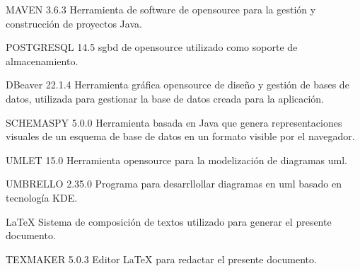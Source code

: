  MAVEN 3.6.3\newline
 Herramienta de software de \gls{opensource} para la gestión y construcción de proyectos Java.
 \newline

 
 POSTGRESQL 14.5\newline
 \acrshort{sgbd} de \gls{opensource} utilizado como soporte de almacenamiento.
\newline
 
 DBeaver 22.1.4\newline
 Herramienta gráfica \gls{opensource} de diseño y gestión de bases de datos, utilizada para gestionar la base de datos creada para la aplicación.
 \newline

 SCHEMASPY 5.0.0\newline
 Herramienta basada en Java que genera representaciones visuales de un esquema de base de datos en un formato visible por el navegador.
 \newline
 
 UMLET 15.0\newline
 Herramienta \gls{opensource} para la modelización de diagramas \acrshort{uml}.
\newline

 
 UMBRELLO 2.35.0\newline
 Programa para desarrllollar diagramas en \acrfull{uml} basado en tecnología KDE.
 \newline
 
 \LaTeX{}\newline
 Sistema de composición de textos utilizado para generar el presente documento.
 \newline
 
 TEXMAKER 5.0.3\newline
 Editor \LaTeX{} para redactar el presente documento.
 \newline
 
 
 

	
